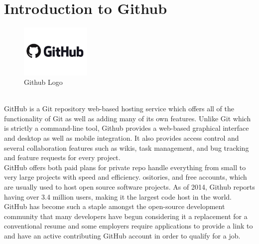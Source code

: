 
\section{Introduction to Github}
\begin{figure}[!ht]
\centering
\includegraphics[width=0.3\textwidth]{input/images/github.jpg}                   
\caption{Github Logo}
\hspace{-1.5em}
\end{figure}
\leavevmode\\
GitHub is a Git repository web-based hosting service which offers all of the functionality of Git as well as adding many of its own features. Unlike Git which is strictly a command-line tool, Github provides a web-based graphical interface and desktop as well as mobile integration. It also provides access control and several collaboration features such as wikis, task management, and bug tracking and feature requests for every project.\\

GitHub offers both paid plans for private repo handle everything from small to very large projects with speed and efficiency. ositories, and free accounts, which are usually used to host open source software projects. As of 2014, Github reports having over 3.4 million users, making it the largest code host in the world.\\

GitHub has become such a staple amongst the open-source development community that many developers have begun considering it a replacement for a conventional resume and some employers require applications to provide a link to and have an active contributing GitHub account in order to qualify for a job.\\

